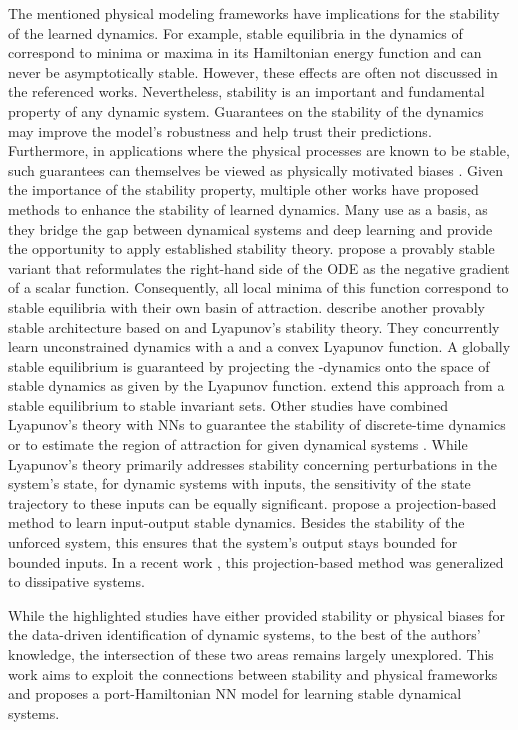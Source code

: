 The mentioned physical modeling frameworks have implications for the stability of the learned dynamics.
For example, stable equilibria in the dynamics of  correspond to minima or maxima in its Hamiltonian energy function and can never be asymptotically stable.
However, these effects are often not discussed in the referenced works.
Nevertheless, stability is an important and fundamental property of any dynamic system. 
Guarantees on the stability of the dynamics may improve the model's robustness and help trust their predictions. 
Furthermore, in applications where the physical processes are known to be stable, such guarantees can themselves be viewed as physically motivated biases \cite{erichson2019}.
Given the importance of the stability property, multiple other works have proposed methods to enhance the stability of learned dynamics. 
Many use \NODEs \cite{chen2018} as a basis, as they bridge the gap between dynamical systems and deep learning and provide the opportunity to apply established stability theory. 
\citet{massaroli2020} propose a provably stable \NODE variant that reformulates the right-hand side of the \gls{ODE} as the negative gradient of a scalar function. Consequently, all local minima of this function correspond to stable equilibria with their own basin of attraction. 
\textcite{kolter2019} describe another provably stable architecture based on \NODEs and Lyapunov's stability theory. 
They concurrently learn unconstrained dynamics with a \NODE and a convex Lyapunov function. A globally stable equilibrium is guaranteed by projecting the \NODE-dynamics onto the space of stable dynamics as given by the Lyapunov function. \citet{takeishi2021} extend this approach from a stable equilibrium to stable invariant sets.
Other studies have combined Lyapunov's theory with \glspl{NN} to guarantee the stability of discrete-time dynamics \cite{lawrence2021,erichson2019} or to estimate the region of attraction for given dynamical systems \cite{richards2018,barreau2024}.
While Lyapunov’s theory primarily addresses stability concerning perturbations in the system’s state, for dynamic systems with inputs, the sensitivity of the state trajectory to these inputs can be equally significant. \textcite{kojima2022} propose a projection-based method to learn input-output stable dynamics. Besides the stability of the unforced system, this ensures that the system's output stays bounded for bounded inputs. In a recent work \cite{okamoto2024}, this projection-based method was generalized to dissipative systems.

While the highlighted studies have either provided stability or physical biases for the data-driven identification of dynamic systems, to the best of the authors' knowledge, the intersection of these two areas remains largely unexplored.
This work aims to exploit the connections between stability and physical frameworks and proposes a port-Hamiltonian \gls{NN} model for learning stable dynamical systems. 
